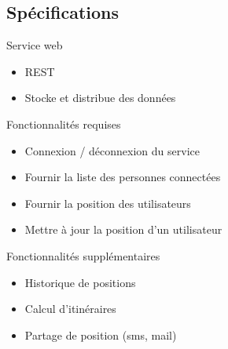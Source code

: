 \documentclass{beamer} %
\begin{document}
  \subsection{Spécifications}
  \begin{frame}{\subsecname}
    \begin{block}{Service web}
      \begin{itemize}
        \item REST
        \item Stocke et distribue des données
      \end{itemize}
    \end{block}

    \pause

    \begin{alertblock}{Fonctionnalités requises}
      \begin{itemize}
        \item Connexion / déconnexion du service
        \item Fournir la liste des personnes connectées
        \item Fournir la position des utilisateurs
        \item Mettre à jour la position d'un utilisateur
      \end{itemize}
    \end{alertblock}

    \pause

    \begin{exampleblock}{Fonctionnalités supplémentaires}
      \begin{itemize}
        \item Historique de positions
        \item Calcul d'itinéraires
        \item Partage de position (sms, mail)
      \end{itemize}
    \end{exampleblock}

  \end{frame}
\end{document}
